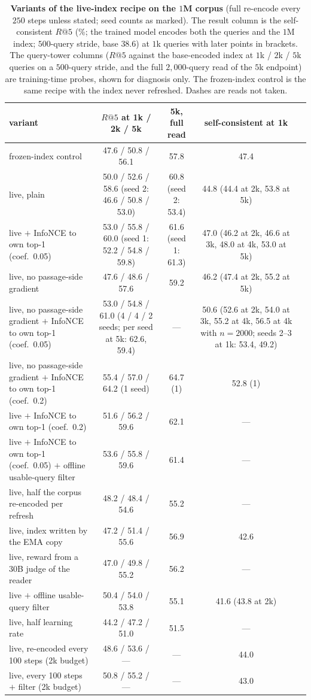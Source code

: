 \begin{table}[H]
\centering\small
\caption{\textbf{Variants of the live-index recipe on the $1$M corpus} (full re-encode every $250$ steps
unless stated; seed counts as marked). The result column is the self-consistent $R@5$ (\%; the trained model encodes both
the queries and the $1$M index; $500$-query stride, base $38.6$) at $1$k queries with later points in brackets. The query-tower
columns ($R@5$ against the base-encoded index at $1$k / $2$k / $5$k queries on a $500$-query stride, and the full $2{,}000$-query
read of the $5$k endpoint) are training-time probes, shown for diagnosis only. The frozen-index control is the same recipe
with the index never refreshed. Dashes are reads not taken.}
\label{tab:rag_1m_variants}
\begin{tabular}{lcccc}
\toprule
variant & $R@5$ at 1k / 2k / 5k & 5k, full read & self-consistent at 1k \\
\midrule
frozen-index control & 47.6 / 50.8 / 56.1 & 57.8 & 47.4 \\
live, plain & 50.0 / 52.6 / 58.6 (seed 2: 46.6 / 50.8 / 53.0) & 60.8 (seed 2: 53.4) & 44.8 (44.4 at 2k, 53.8 at 5k) \\
live $+$ InfoNCE to own top-1 (coef.\ 0.05) & 53.0 / 55.8 / 60.0 (seed 1: 52.2 / 54.8 / 59.8) & 61.6 (seed 1: 61.3) & 47.0 (46.2 at 2k, 46.6 at 3k, 48.0 at 4k, 53.0 at 5k) \\
live, no passage-side gradient & 47.6 / 48.6 / 57.6 & 59.2 & 46.2 (47.4 at 2k, 55.2 at 5k) \\
live, no passage-side gradient $+$ InfoNCE to own top-1 (coef.\ 0.05) & 53.0 / 54.8 / 61.0 (4 / 4 / 2 seeds; per seed at 5k: 62.6, 59.4) & --- & 50.6 (52.6 at 2k, 54.0 at 3k, 55.2 at 4k, 56.5 at 4k with $n{=}2000$; seeds 2--3 at 1k: 53.4, 49.2) \\
live, no passage-side gradient $+$ InfoNCE to own top-1 (coef.\ 0.2) & 55.4 / 57.0 / 64.2 (1 seed) & 64.7 (1) & 52.8 (1) \\
live $+$ InfoNCE to own top-1 (coef.\ 0.2) & 51.6 / 56.2 / 59.6 & 62.1 & --- \\
live $+$ InfoNCE to own top-1 (coef.\ 0.05) $+$ offline usable-query filter & 53.6 / 55.8 / 59.6 & 61.4 & --- \\
live, half the corpus re-encoded per refresh & 48.2 / 48.4 / 54.6 & 55.2 & --- \\
live, index written by the EMA copy & 47.2 / 51.4 / 55.6 & 56.9 & 42.6 \\
live, reward from a 30B judge of the reader & 47.0 / 49.8 / 55.2 & 56.2 & --- \\
live $+$ offline usable-query filter & 50.4 / 54.0 / 53.8 & 55.1 & 41.6 (43.8 at 2k) \\
live, half learning rate & 44.2 / 47.2 / 51.0 & 51.5 & --- \\
live, re-encoded every 100 steps (2k budget) & 48.6 / 53.6 / --- & --- & 44.0 \\
live, every 100 steps $+$ filter (2k budget) & 50.8 / 55.2 / --- & --- & 43.0 \\
\bottomrule
\end{tabular}
\end{table}
